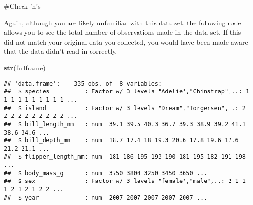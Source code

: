 \documentclass[
]{article}
\newenvironment{Shaded}{\begin{snugshade}}{\end{snugshade}}
\newcommand{\FunctionTok}[1]{\textcolor[rgb]{0.13,0.29,0.53}{\textbf{#1}}}
\newcommand{\NormalTok}[1]{#1}
\newcommand{\SpecialCharTok}[1]{\textcolor[rgb]{0.81,0.36,0.00}{\textbf{#1}}}
\begin{document}
\#Check 'n's

Again, although you are likely unfamiliar with this data set, the
following code allows you to see the total number of observations made
in the data set. If this did not match your original data you collected,
you would have been made aware that the data didn't read in correctly.

\begin{Shaded}
\begin{Highlighting}[]
\FunctionTok{str}\NormalTok{(fullframe)}
\end{Highlighting}
\end{Shaded}

\begin{verbatim}
## 'data.frame':    335 obs. of  8 variables:
##  $ species          : Factor w/ 3 levels "Adelie","Chinstrap",..: 1 1 1 1 1 1 1 1 1 1 ...
##  $ island           : Factor w/ 3 levels "Dream","Torgersen",..: 2 2 2 2 2 2 2 2 2 2 ...
##  $ bill_length_mm   : num  39.1 39.5 40.3 36.7 39.3 38.9 39.2 41.1 38.6 34.6 ...
##  $ bill_depth_mm    : num  18.7 17.4 18 19.3 20.6 17.8 19.6 17.6 21.2 21.1 ...
##  $ flipper_length_mm: num  181 186 195 193 190 181 195 182 191 198 ...
##  $ body_mass_g      : num  3750 3800 3250 3450 3650 ...
##  $ sex              : Factor w/ 3 levels "female","male",..: 2 1 1 1 2 1 2 1 2 2 ...
##  $ year             : num  2007 2007 2007 2007 2007 ...
\end{verbatim}

\begin{Shaded}
\end{Shaded}
\end{document}
